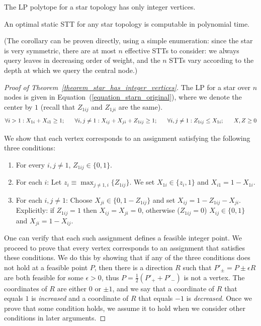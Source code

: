 \begin{theorem}
\label{theorem_star_has_integer_vertices}
The LP polytope for a star topology has only integer vertices.
\end{theorem}

\begin{corollary}
An optimal static STT for any star topology is computable in polynomial time.
\end{corollary}

(The corollary can be proven directly, using a simple enumeration: since the star is very symmetric, there are at most $n$ effective STTs to consider: we always query leaves in decreasing order of weight, and the $n$ STTs vary according to the depth at which we query the central node.)



\begin{proof}[Proof of Theorem~\ref{theorem_star_has_integer_vertices}]
The LP for a star over $n$ nodes is given in Equation~(\ref{equation_starn_original}), where we denote the center by $1$ (recall that $Z_{1ij}$ and $Z_{1ji}$ are the same).
\begin{equation}
\label{equation_starn_original}
    \forall i>1: X_{1i}+X_{i1} \ge 1 ; \\  \ \ \ \ \ 
    \forall i,j \ne 1: X_{ij} + X_{ji} + Z_{1ij} \ge 1 ; \\  \ \ \ \ \ 
    \forall i,j \ne 1: Z_{1ij} \le X_{1i} ; \\  \ \ \ \ \ 
    X,Z \ge 0 \\
\end{equation}

We show that each vertex corresponds to an assignment satisfying the following three conditions:
\begin{enumerate}
    \item \label{assign1} For every $i,j \ne 1$, $Z_{1ij} \in \{0,1\}$.
    \item \label{assign2} For each $i$: Let $z_i \equiv \max_{j \ne 1,i} \{Z_{1ij}\}$. We set $X_{1i} \in \{z_i,1\}$ and  $X_{i1} = 1 - X_{1i}$.
    \item \label{assign3} For each $i,j \ne 1$: Choose $X_{ji} \in \{0,1-Z_{1ij}\}$ and set $X_{ij}=1-Z_{1ij}-X_{ji}$. Explicitly: if $Z_{1ij}=1$ then $X_{ij}=X_{ji}=0$, otherwise ($Z_{1ij} = 0$) $X_{ij} \in \{0,1\}$ and $X_{ji} = 1-X_{ij}$.
\end{enumerate}
One can verify that each such assignment defines a feasible integer point. We proceed to prove that every vertex corresponds to an assignment that satisfies these conditions. We do this by showing that if any of the three conditions does not hold at a feasible point $P$, then there is a direction $R$ such that $P'_{\pm} = P \pm \epsilon R$ are both feasible for some $\epsilon > 0$, thus $P = \frac{1}{2} (P'_{+} + P'_{-})$ is not a vertex. The coordinates of $R$ are either $0$ or $\pm 1$, and we say that a coordinate of $R$ 
that equals $1$ is \emph{increased}
and a coordinate of $R$ that equals $-1$ is \emph{decreased}.
 Once we prove that some condition holds, we assume it to hold when we consider other conditions in later arguments.


\end{proof}
